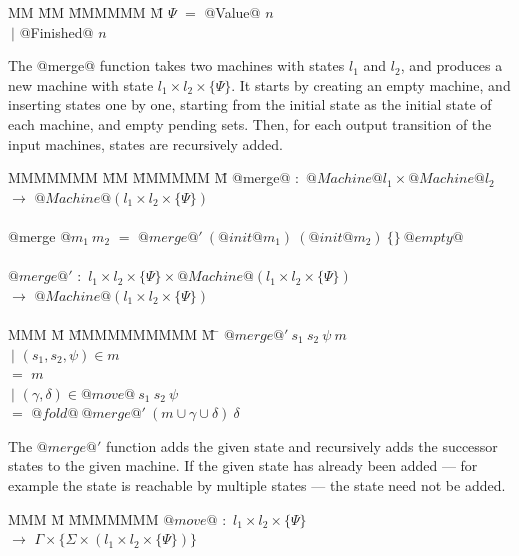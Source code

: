 \begin{tabbing}
MM \= MM \= MMMMMM \= M\kill
$\Psi$ \> $=$  \> @Value@     \> $n$         \\
       \> $~|$ \> @Finished@  \> $n$         \\
\end{tabbing}

The @merge@ function takes two machines with states $l_1$ and $l_2$, and produces a new machine with state $l_1 \times l_2 \times \{\Psi\}$.
It starts by creating an empty machine, and inserting states one by one, starting from the initial state as the initial state of each machine, and empty pending sets.
Then, for each output transition of the input machines, states are recursively added.

\begin{tabbing}
MMMMMMM \= MM \= MMMMMM \= M\kill
@merge@ \> $:$ \> $@Machine @l_1 \times @Machine @l_2$ \\
        \> $\to$ \> $@Machine @(l_1 \times l_2 \times \{\Psi\})$ \\
\\
@merge @$m_1~m_2$ \> $=$ \> $@merge@'~(@init @m_1)~(@init @m_2)~\{\}~@empty@$ \\
\\
$@merge@'$ \> $:$ \> $l_1 \times l_2 \times \{\Psi\} \times @Machine @(l_1 \times l_2 \times \{\Psi\})$ \\
           \> $\to$ \> $@Machine @(l_1 \times l_2 \times \{\Psi\})$ \\
\\
MMM \= M \= MMMMMMMMMM \= M \=\kill
$@merge@'~s_1~s_2~\psi~m$ \\
 \> $~|$ \> $(s_1, s_2, \psi) \in m$  \\
 \> $=$  \> $m$ \\
 \> $~|$ \> $(\gamma,\delta) \in @move@~s_1~s_2~\psi$ \\
 \> $=$  \> $@fold@~@merge@'~(m \cup \gamma \cup \delta)~\delta$ \\
\end{tabbing}

The $@merge@'$ function adds the given state and recursively adds the successor states to the given machine.
If the given state has already been added --- for example the state is reachable by multiple states --- the state need not be added.

\begin{tabbing}
MMM \= M \= MMMMMMM\kill
$@move@$ \> $:$ \> $l_1 \times l_2 \times \{\Psi\}$ \\
           \> $\to$ \> $\Gamma \times \{\Sigma \times (l_1 \times l_2 \times \{\Psi\})\}$ \\
\end{tabbing}

